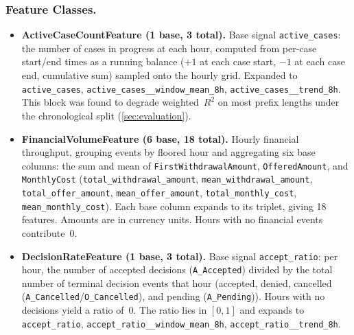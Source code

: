 \documentclass[runningheads]{llncs}
\begin{document}
\subsubsection{Feature Classes.}
\begin{itemize}
    \item \textbf{ActiveCaseCountFeature (1 base, 3 total).}
          Base signal \texttt{active\_cases}: the number of cases in progress at
          each hour, computed from per-case start/end times as a running balance
          ($+1$ at each case start, $-1$ at each case end, cumulative sum) sampled
          onto the hourly grid. Expanded to \texttt{active\_cases},
          \texttt{active\_cases\_\_window\_mean\_8h},
          \texttt{active\_cases\_\_trend\_8h}. This block was found to degrade
          weighted~$R^2$ on most prefix lengths under the chronological split
          (\autoref{sec:evaluation}).
    \item \textbf{FinancialVolumeFeature (6 base, 18 total).}
          Hourly financial throughput, grouping events by floored hour and
          aggregating six base columns: the sum and mean of
          \texttt{FirstWithdrawalAmount}, \texttt{OfferedAmount}, and
          \texttt{MonthlyCost} (\texttt{total\_withdrawal\_amount},
          \texttt{mean\_withdrawal\_amount}, \texttt{total\_offer\_amount},
          \texttt{mean\_offer\_amount}, \texttt{total\_monthly\_cost},
          \texttt{mean\_monthly\_cost}). Each base column expands to its triplet,
           giving 18 features. Amounts are in currency units. Hours with no
           financial events contribute~0.
    \item \textbf{DecisionRateFeature (1 base, 3 total).}
          Base signal \texttt{accept\_ratio}: per hour, the number of accepted
          decisions (\texttt{A\_Accepted}) divided by the total number of terminal
          decision events that hour (accepted, denied, cancelled
          (\texttt{A\_Cancelled}/\texttt{O\_Cancelled}), and pending
          (\texttt{A\_Pending})). Hours with no decisions yield a ratio of~0. The
          ratio lies in $[0,1]$ and expands to \texttt{accept\_ratio},
          \texttt{accept\_ratio\_\_window\_mean\_8h},
          \texttt{accept\_ratio\_\_trend\_8h}.
\end{itemize}
\end{document}
